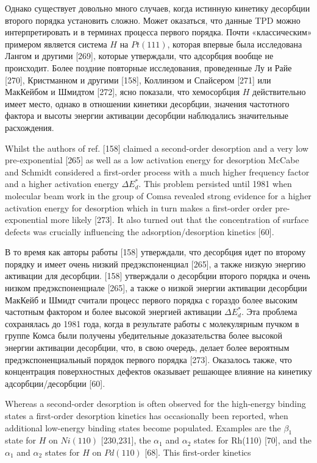 \documentclass[11pt]{article}
\begin{document}
    Однако существует довольно много случаев, когда истинную кинетику
десорбции второго порядка установить сложно. Может оказаться, что данные
TPD можно интерпретировать и в терминах процесса первого порядка. Почти
«классическим» примером является система \(H\) на \(Pt(111)\), которая
впервые была исследована Лангом и другими {[}269{]}, которые утверждали,
что адсорбция вообще не происходит. Более поздние повторные
исследования, проведенные Лу и Райе {[}270{]}, Кристманном и другими
{[}158{]}, Коллинзом и Спайсером {[}271{]} или МакКейбом и Шмидтом
{[}272{]}, ясно показали, что хемосорбция \(H\) действительно имеет
место, однако в отношении кинетики десорбции, значения частотного
фактора и высоты энергии активации десорбции наблюдались значительные
расхождения.

    Whilst the authors of ref. {[}158{]} claimed a second-order desorption
and a very low pre-exponential {[}265{]} as well as a low activation
energy for desorption McCabe and Schmidt considered a first-order
process with a much higher frequency factor and a higher activation
energy \(\Delta E^{*}_{d}\). This problem persisted until 1981 when
molecular beam work in the group of Comsa revealed strong evidence for a
higher activation energy for desorption which in turn makes a
first-order order pre-exponential more likely {[}273{]}. It also turned
out that the concentration of surface defects was crucially influencing
the adsorption/desorption kinetics {[}60{]}.

    В то время как авторы работы {[}158{]} утверждали, что десорбция идет по
второму порядку и имеет очень низкий предэкспоненциал {[}265{]}, а также
низкую энергию активации для десорбции. {[}158{]} утверждали о десорбции
второго порядка и очень низком предэкспоненциале {[}265{]}, а также о
низкой энергии активации десорбции МакКейб и Шмидт считали процесс
первого порядка с гораздо более высоким частотным фактором и более
высокой энергией активации \(\Delta E^{*}_{d}\). Эта проблема
сохранялась до 1981 года, когда в результате работы с молекулярным
пучком в группе Комса были получены убедительные доказательства более
высокой энергии активации десорбции, что, в свою очередь, делает более
вероятным предэкспоненциальный порядок первого порядка {[}273{]}.
Оказалось также, что концентрация поверхностных дефектов оказывает
решающее влияние на кинетику адсорбции/десорбции {[}60{]}.

    Whereas a second-order desorption is often observed for the high-energy
binding states a first-order desorption kinetics has occasionally been
reported, when additional low-energy binding states become populated.
Examples are the \(\beta_1\) state for \(H\) on \(Ni(110)\)
{[}230,231{]}, the \(\alpha_1\) and \(\alpha_2\) states for Rh(110)
{[}70{]}, and the \(\alpha_1\) and \(\alpha_2\) states for \(H\) on
\(Pd(110)\) {[}68{]}. This first-order kinetics
\end{document}
